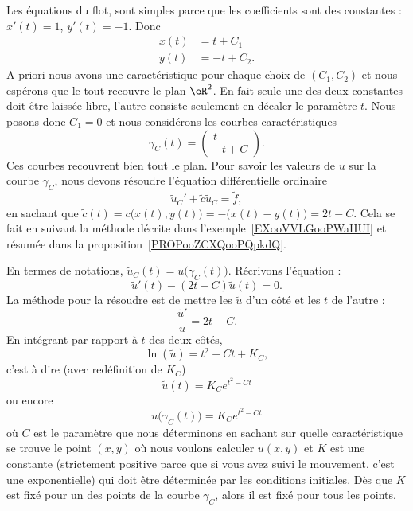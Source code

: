 Les équations du flot, sont simples parce que les coefficients sont des constantes : \( x'(t)=1\), \( y'(t)=-1\). Donc
\begin{subequations}
    \begin{align}
        x(t)&=t+C_1\\
        y(t)&=-t+C_2.
    \end{align}
\end{subequations}
A priori nous avons une caractéristique pour chaque choix de \( (C_1,C_2)\) et nous espérons que le tout recouvre le plan \( \eR^2\). En fait seule une des deux constantes doit être laissée libre, l'autre consiste seulement en décaler le paramètre \( t\). Nous posons donc \( C_1=0\) et nous considérons les courbes caractéristiques
\begin{equation}
    \gamma_C(t)=\begin{pmatrix}
        t    \\
        -t+C
    \end{pmatrix}.
\end{equation}
Ces courbes recouvrent bien tout le plan. Pour savoir les valeurs de \( u\) sur la courbe \( \gamma_C\), nous devons résoudre l'équation différentielle ordinaire
\begin{equation}
    \tilde u_C'+\tilde c\tilde u_C=\tilde f,
\end{equation}
en sachant que \( \tilde c(t)=c\big( x(t),y(t) \big)=-\big( x(t)-y(t) \big)=2t-C\). Cela se fait en suivant la méthode décrite dans l'exemple~\ref{EXooVVLGooPWaHUI} et résumée dans la proposition~\ref{PROPooZCXQooPQpkdQ}.

En termes de notations, \( \tilde u_C(t)=u\big( \gamma_C(t) \big)\). Récrivons l'équation :
\begin{equation}
    \tilde u'(t)-(2t-C)\tilde u(t)=0.
\end{equation}
La méthode pour la résoudre est de mettre les \( \tilde u\) d'un côté et les \( t\) de l'autre :
\begin{equation}
    \frac{ \tilde u' }{ u }=2t-C.
\end{equation}
En intégrant par rapport à \( t\) des deux côtés,
\begin{equation}
    \ln(\tilde u)=t^2-Ct+K_C,
\end{equation}
c'est à dire (avec redéfinition de \( K_C\))
\begin{equation}
    \tilde u(t)=K_C e^{t^2-Ct}
\end{equation}
ou encore
\begin{equation}   \label{EQooSSTJooEQfRnP}
    u\big( \gamma_C(t) \big)=K_C e^{t^2-Ct}
\end{equation}
où \( C\) est le paramètre que nous déterminons en sachant sur quelle caractéristique se trouve le point \( (x,y)\) où nous voulons calculer \( u(x,y)\) et \( K\) est une constante (strictement positive parce que si vous avez suivi le mouvement, c'est une exponentielle) qui doit être déterminée par les conditions initiales. Dès que \( K\) est fixé pour un des points de la courbe \( \gamma_C\), alors il est fixé pour tous les points.

